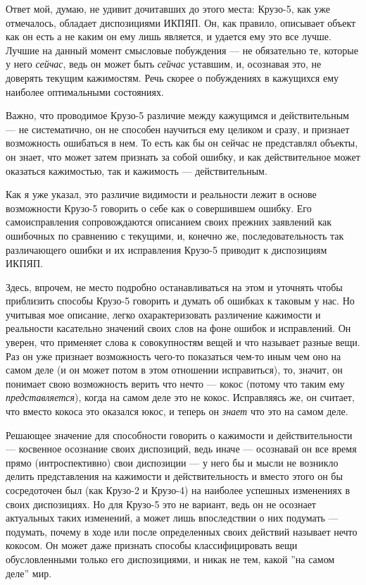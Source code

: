 \documentclass[11pt]{book}
\begin{document}
Ответ мой, думаю, не удивит дочитавших до этого места: Крузо-5, как уже отмечалось, обладает диспозициями ИКПЯП. Он, как правило, описывает объект как он есть а не каким он ему лишь является, и удается ему это все лучше. Лучшие на данный момент смысловые побуждения --- не обязательно те, которые у него \textit{сейчас}, ведь он может быть \textit{сейчас} уставшим, и, осознавая это, не доверять текущим кажимостям. Речь скорее о побуждениях в кажущихся ему наиболее оптимальными состояниях.

Важно, что проводимое Крузо-5 различие между кажущимся и действительным --- не систематично, он не способен научиться ему целиком и сразу, и признает возможность ошибаться в нем. То есть как бы он сейчас не представлял объекты, он знает, что может затем признать за собой ошибку, и как действительное может оказаться кажимостью, так и кажимость --- действительным.

Как я уже указал, это различие видимости и реальности лежит в основе возможности Крузо-5 говорить о себе как о совершившем ошибку. Его самоисправления сопровождаются описанием своих прежних заявлений как ошибочных по сравнению с текущими, и, конечно же, последовательность так различающего ошибки и их исправления Крузо-5 приводит к диспозициям ИКПЯП.

Здесь, впрочем, не место подробно останавливаться на этом и уточнять чтобы приблизить способы Крузо-5 говорить и думать об ошибках к таковым у нас. Но учитывая мое описание, легко охарактеризовать различение кажимости и реальности касательно значений своих слов на фоне ошибок и исправлений. Он уверен, что применяет слова к совокупностям вещей и что называет разные вещи. Раз он уже признает возможность чего-то показаться чем-то иным чем оно на самом деле (и он может потом в этом отношении исправиться), то, значит, он понимает свою возможность верить что нечто --- кокос (потому что таким ему \textit{представляется}), когда на самом деле это не кокос. Исправляясь же, он считает, что вместо кокоса это оказался юкос, и теперь он \textit{знает} что это на самом деле.

Решающее значение для способности говорить о кажимости и действительности --- косвенное осознание своих диспозиций, ведь иначе --- осознавай он все время прямо (интроспективно) свои диспозиции --- у него бы и мысли не возникло делить представления на кажимости и действительность и вместо этого он бы сосредоточен был (как Крузо-2 и Крузо-4) на наиболее успешных изменениях в своих диспозициях. Но для Крузо-5 это не вариант, ведь он не осознает актуальных таких изменений, а может лишь впоследствии о них подумать --- подумать, почему в ходе или после определенных своих действий называет нечто кокосом. Он может даже признать способы классифицировать вещи обусловленными только его диспозициями, и никак не тем, какой ''на самом деле'' мир.
\end{document}
